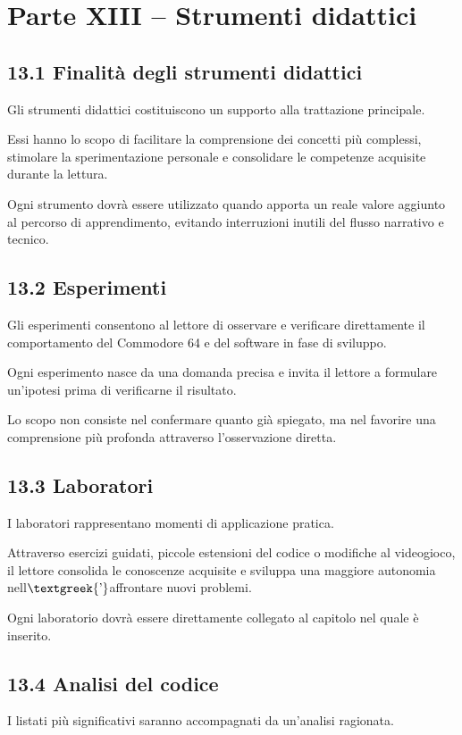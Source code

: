 \documentclass{article}
\begin{document}
\section{Parte XIII – Strumenti didattici}
\subsection{13.1 Finalità degli strumenti didattici}
Gli strumenti didattici costituiscono un supporto alla trattazione principale.

Essi hanno lo scopo di facilitare la comprensione dei concetti più complessi, stimolare la sperimentazione personale e
consolidare le competenze acquisite durante la lettura.

Ogni strumento dovrà essere utilizzato quando apporta un reale valore aggiunto al percorso di apprendimento, evitando
interruzioni inutili del flusso narrativo e tecnico.

\subsection{13.2 Esperimenti}
Gli esperimenti consentono al lettore di osservare e verificare direttamente il comportamento del Commodore 64 e del
software in fase di sviluppo.

Ogni esperimento nasce da una domanda precisa e invita il lettore a formulare un'ipotesi prima di verificarne il
risultato.

Lo scopo non consiste nel confermare quanto già spiegato, ma nel favorire una comprensione più profonda attraverso
l'osservazione diretta.

\subsection{13.3 Laboratori}
I laboratori rappresentano momenti di applicazione pratica.

Attraverso esercizi guidati, piccole estensioni del codice o modifiche al videogioco, il lettore consolida le conoscenze
acquisite e sviluppa una maggiore autonomia nell$\text{\textgreek{’}}$affrontare nuovi problemi.

Ogni laboratorio dovrà essere direttamente collegato al capitolo nel quale è inserito.

\subsection{13.4 Analisi del codice}
I listati più significativi saranno accompagnati da un'analisi ragionata.
\end{document}
